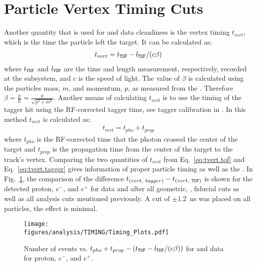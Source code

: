 \section{Particle Vertex Timing Cuts}\label{sec:analysis.timing}
Another quantity that is used for  and data cleanliness is the vertex timing $t_{vert}$, which is the time the particle left the target. It can be calculated as;
\begin{align}
t_{vert}= t_{\textsc{\texttt{TOF}}} -  l_{\textsc{\texttt{TOF}}}/(c\beta) \label{eq:tvert.tof}
\end{align}
where $t_{\textsc{\texttt{TOF}}}$ and $l_{\textsc{\texttt{TOF}}}$ are the time and length measurement, respectively, recorded at the  subsystem, and $c$ is the speed of light. The value of $\beta$ is calculated using the particles mass, $m$, and momentum, $p$, as measured from the . Therefore $\beta = \frac{p}{E} = \frac{p}{\sqrt{p^2+m^2}}$. Another means of calculating $t_{vert}$ is to use the timing of the tagger hit using the RF-corrected tagger time, see tagger calibration in \cite{clas.g12.note}. In this method $t_{vert}$ is calculated as;
\begin{align}
t_{vert}=t_{pho} + t_{prop} \label{eq:tvert.tagger}
\end{align}
where $t_{pho}$ is the RF-corrected time that the photon crossed the center of the target and $t_{prop}$ is the propagation time from the center of the target to the track's vertex. Comparing the two quantities of $t_{vert}$ from Eq.~\ref{eq:tvert.tof} and Eq.~\ref{eq:tvert.tagger} gives information of proper particle timing as well as the . In Fig.~\ref{fig:timing.all}, the comparison of the difference $t_{(vert, \ tagger)} - t_{(vert,\ \abbr{TOF})}$ is shown for the detected proton, $e^-$, and $e^+$ for data and  after all geometric, ,  fiducial cuts as well as all analysis cuts mentioned previously. A cut of $\pm 1.2$~ns was placed on all particles, the effect is minimal.


\begin{figure}[h!]\begin{center}
\texttt{[image: \\figures/analysis/TIMING/Timing\_Plots.pdf]}
\caption[Number of events vs. $t_{pho} + t_{prop} - (t_{\abbr{TOF}} -  l_{\abbr{TOF}}/(c\beta))$ for  and data for proton, $e^-$, and $e^+$]{\label{fig:timing.all}Number of events vs. $t_{pho} + t_{prop} - (t_{\abbr{TOF}} -  l_{\abbr{TOF}}/(c\beta))$ for  and data for proton, $e^-$, and $e^+$.}
\end{center}\end{figure}

